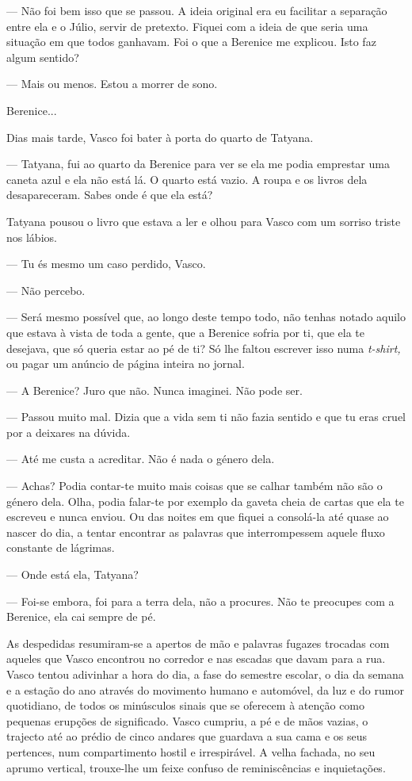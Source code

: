 --- Não foi bem isso que se passou. A ideia original era eu facilitar a
  separação entre ela e o Júlio, servir de pretexto. Fiquei com a ideia
  de que seria uma situação em que todos ganhavam. Foi o que a Berenice
  me explicou. Isto faz algum sentido?

--- Mais ou menos. Estou a morrer de sono.

Berenice...


Dias mais tarde, Vasco foi bater à porta do quarto de Tatyana.

--- Tatyana, fui ao quarto da Berenice para ver se ela me podia emprestar
  uma caneta azul e ela não está lá. O quarto está vazio. A roupa e os
  livros dela desapareceram. Sabes onde é que ela está?


Tatyana pousou o livro que estava a ler e olhou para Vasco com um
sorriso triste nos lábios.

--- Tu és mesmo um caso perdido, Vasco.

--- Não percebo.

--- Será mesmo possível que, ao longo deste tempo todo, não tenhas notado
  aquilo que estava à vista de toda a gente, que a Berenice sofria por
  ti, que ela te desejava, que só queria estar ao pé de ti? Só lhe
  faltou escrever isso numa \emph{t-shirt, }ou pagar um anúncio de
  página inteira no jornal.

--- A Berenice? Juro que não. Nunca imaginei. Não pode ser.

--- Passou muito mal. Dizia que a vida sem ti não fazia
sentido e que tu eras cruel por a deixares na dúvida.

--- Até me custa a acreditar. Não é nada o género dela.

--- Achas? Podia contar-te muito mais coisas que se calhar
também não são o género dela. Olha, podia falar-te por exemplo
da gaveta cheia de cartas que ela te escreveu e nunca enviou. Ou das
noites em que fiquei a consolá-la até quase ao nascer do dia, a tentar
encontrar as palavras que interrompessem aquele fluxo constante de
lágrimas.

--- Onde está ela, Tatyana?

--- Foi-se embora, foi para a terra dela, não a procures.
Não te preocupes com a Berenice, ela cai sempre de pé.

As despedidas resumiram-se a apertos de mão e palavras fugazes trocadas
com aqueles que Vasco encontrou no corredor e nas escadas que davam para
a rua. Vasco tentou adivinhar a hora do dia, a fase do semestre escolar,
o dia da semana e a estação do ano através do movimento humano e
automóvel, da luz e do rumor quotidiano, de todos os minúsculos sinais
que se oferecem à atenção como pequenas erupções de significado. Vasco
cumpriu, a pé e de mãos vazias, o trajecto até ao prédio de cinco
andares que guardava a sua cama e os seus pertences, num compartimento
hostil e irrespirável. A velha fachada, no seu aprumo vertical,
trouxe-lhe um feixe confuso de reminiscências e inquietações.

